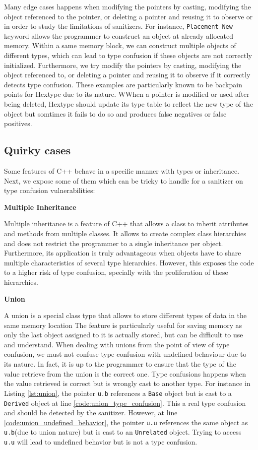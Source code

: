 \documentclass[a4paper,11pt,oneside]{report}
\begin{document}
\noindent{}Many edge cases happens when modifying the pointers by casting,
modifying the object referenced to the pointer, or deleting a pointer and
reusing it to observe or in order to study the limitations of sanitizers. For
instance, \texttt{Placement New} keyword allows the programmer to construct an
object at already allocated memory.  Within a same memory block, we can
construct multiple objects of different types, which can lead to type confusion
if these objects are not correctly initialized. Furthermore, we try modify the
pointers by casting, modifying the object referenced to, or deleting a pointer
and reusing it to observe if it correctly detects type confusion. These examples
are particularly known to be backpain points for Hextype due to its nature.
WWhen a pointer is modified or used after being deleted, Hextype should update 
its type table to reflect the new type of the object but somtimes it fails to do
so and produces false negatives or false positives.

\subsection{Quirky cases}

Some features of C++ behave in a specific manner with types or inheritance.
Next, we expose some of them which can be tricky to handle for a sanitizer on
type confusion vulnerabilities:

\textbf{Multiple Inheritance}

\noindent{}Multiple inheritance is a feature of C++ that allows a class to
inherit attributes and methods from multiple classes.  It allows to create
complex class hierarchies and does not restrict the programmer to a single
inheritance per object. Furthermore, its application is truly advantageous when
objects have to share multiple characteristics of several type hierarchies. 
However, this exposes the code to a higher risk of type confusion, specially
with the proliferation of these hierarchies.  

\textbf{Union}

\noindent{}A union is a special class type that allows to store different types
of data in the same memory location The feature is particularly useful for
saving memory as only the last object assigned to it is actually stored, but can
be difficult to use and understand. When dealing with unions from the point of
view of type confusion, we must not confuse type confusion with undefined
behaviour due to its nature. In fact, it is up to the programmer to ensure that
the type of the value retrieve from the union is the correct one. Type
confusions happens when the value retrieved is correct but is wrongly cast to
another type. For instance in Listing \autoref{lst:union}, the pointer
\texttt{u.b} references a \texttt{Base} object but is cast to a \texttt{Derived}
object at line \ref{code:union_type_confusion}.  This a real type confusion and
should be detected by the sanitizer. However, at line
\ref{code:union_undefined_behavior}, the pointer \texttt{u.u} references the
same object as \texttt{u.b}(due to union nature) but is cast to an
\texttt{Unrelated} object.  Trying to access \texttt{u.u} will lead to undefined
behavior but is not a type confusion.
\end{document}
